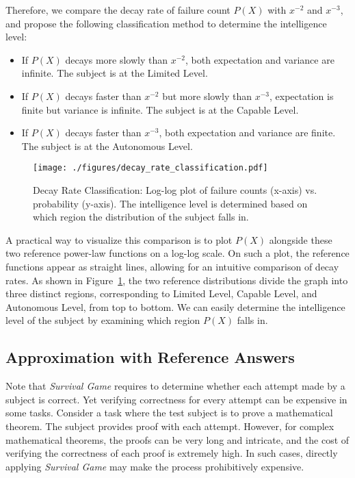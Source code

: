 Therefore, we compare the decay rate of failure count \( P(X) \) with \( x^{-2} \) and \( x^{-3} \), and propose the following classification method to determine the intelligence level:

\begin{itemize}
	\item If \( P(X) \) decays more slowly than \( x^{-2} \), both expectation and variance are infinite. The subject is at the Limited Level.
	\item If \( P(X) \) decays faster than \( x^{-2} \) but more slowly than \( x^{-3} \), expectation is finite but variance is infinite. The subject is at the Capable Level.
    \item If \( P(X) \) decays faster than \( x^{-3} \), both expectation and variance are finite. The subject is at the Autonomous Level.
\end{itemize}

\begin{figure}[t]
  \centering
  \texttt{[image: ./figures/decay\_rate\_classification.pdf]}
  \caption{Decay Rate Classification: Log-log plot of failure counts (x-axis) vs. probability (y-axis). The intelligence level is determined based on which region the distribution of the subject falls in.}
  \label{fig:decay_rate_classify}
\end{figure}

A practical way to visualize this comparison is to plot \( P(X) \) alongside these two reference power-law functions on a log-log scale. On such a plot, the reference functions appear as straight lines, allowing for an intuitive comparison of decay rates. As shown in Figure~\ref{fig:decay_rate_classify}, the two reference distributions divide the graph into three distinct regions, corresponding to Limited Level, Capable Level, and Autonomous Level, from top to bottom. We can easily determine the intelligence level of the subject by examining which region \( P(X) \) falls in. 


\subsection{Approximation with Reference Answers}

Note that \textit{Survival Game} requires to determine whether each attempt made by a subject is correct. Yet verifying correctness for every attempt can be expensive in some tasks. Consider a task where the test subject is to prove a mathematical theorem. The subject provides proof with each attempt. However, for complex mathematical theorems, the proofs can be very long and intricate, and the cost of verifying the correctness of each proof is extremely high. In such cases, directly applying \textit{Survival Game} may make the process prohibitively expensive.

